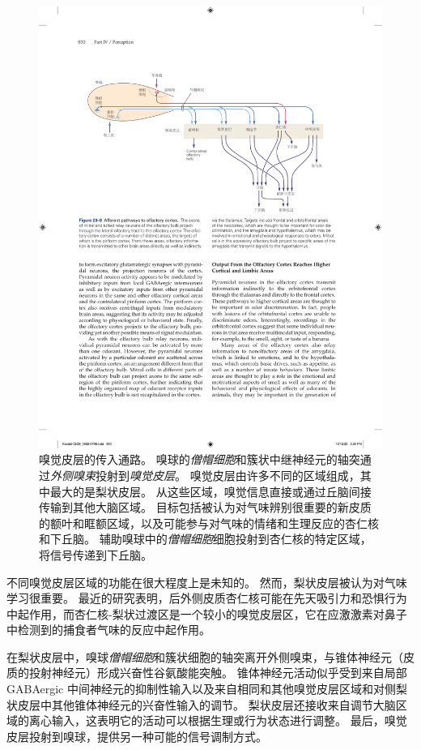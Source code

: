 \begin{figure}[htbp]
	\centering
	\includegraphics[width=0.9\linewidth]{chap29/fig_29_8}
	\caption{嗅觉皮层的传入通路。
		嗅球的\textit{僧帽细胞}和簇状中继神经元的轴突通过\textit{外侧嗅束}投射到\textit{嗅觉皮层}。
		嗅觉皮层由许多不同的区域组成，其中最大的是梨状皮层。
		从这些区域，嗅觉信息直接或通过丘脑间接传输到其他大脑区域。
		目标包括被认为对气味辨别很重要的新皮质的额叶和眶额区域，以及可能参与对气味的情绪和生理反应的杏仁核和下丘脑。
		辅助嗅球中的\textit{僧帽细胞}细胞投射到杏仁核的特定区域，将信号传递到下丘脑。}
	\label{fig:29_8}
\end{figure}


不同嗅觉皮层区域的功能在很大程度上是未知的。
然而，梨状皮层被认为对气味学习很重要。
最近的研究表明，后外侧皮质杏仁核可能在先天吸引力和恐惧行为中起作用，而杏仁核-梨状过渡区是一个较小的嗅觉皮层区，它在应激激素对鼻子中检测到的捕食者气味的反应中起作用。


在梨状皮层中，嗅球\textit{僧帽细胞}和簇状细胞的轴突离开外侧嗅束，与锥体神经元（皮质的投射神经元）形成兴奋性谷氨酸能突触。
锥体神经元活动似乎受到来自局部 GABAergic 中间神经元的抑制性输入以及来自相同和其他嗅觉皮层区域和对侧梨状皮层中其他锥体神经元的兴奋性输入的调节。
梨状皮层还接收来自调节大脑区域的离心输入，这表明它的活动可以根据生理或行为状态进行调整。
最后，嗅觉皮层投射到嗅球，提供另一种可能的信号调制方式。


